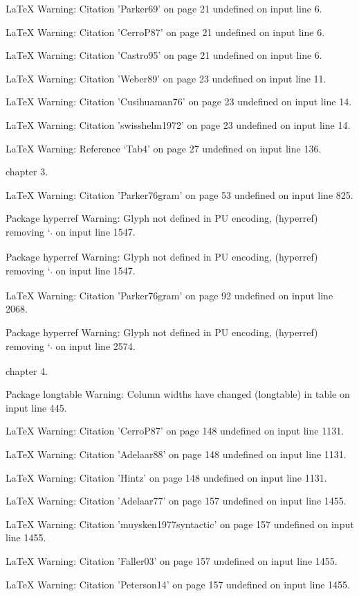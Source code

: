LaTeX Warning: Citation 'Parker69' on page 21 undefined on input line 6.


LaTeX Warning: Citation 'CerroP87' on page 21 undefined on input line 6.


LaTeX Warning: Citation 'Castro95' on page 21 undefined on input line 6.


LaTeX Warning: Citation 'Weber89' on page 23 undefined on input line 11.


LaTeX Warning: Citation 'Cusihuaman76' on page 23 undefined on input line 14.


LaTeX Warning: Citation 'swisshelm1972' on page 23 undefined on input line 14.


LaTeX Warning: Reference `Tab4' on page 27 undefined on input line 136.

chapter 3.

LaTeX Warning: Citation 'Parker76gram' on page 53 undefined on input line 825.


Package hyperref Warning: Glyph not defined in PU encoding,
(hyperref)                removing `\textsubscript' on input line 1547.


Package hyperref Warning: Glyph not defined in PU encoding,
(hyperref)                removing `\textsubscript' on input line 1547.


LaTeX Warning: Citation 'Parker76gram' on page 92 undefined on input line 2068.


Package hyperref Warning: Glyph not defined in PU encoding,
(hyperref)                removing `\textsubscript' on input line 2574.

chapter 4.

Package longtable Warning: Column widths have changed
(longtable)                in table  on input line 445.


LaTeX Warning: Citation 'CerroP87' on page 148 undefined on input line 1131.


LaTeX Warning: Citation 'Adelaar88' on page 148 undefined on input line 1131.


LaTeX Warning: Citation 'Hintz' on page 148 undefined on input line 1131.


LaTeX Warning: Citation 'Adelaar77' on page 157 undefined on input line 1455.


LaTeX Warning: Citation 'muysken1977syntactic' on page 157 undefined on input line 1455.


LaTeX Warning: Citation 'Faller03' on page 157 undefined on input line 1455.


LaTeX Warning: Citation 'Peterson14' on page 157 undefined on input line 1455.


